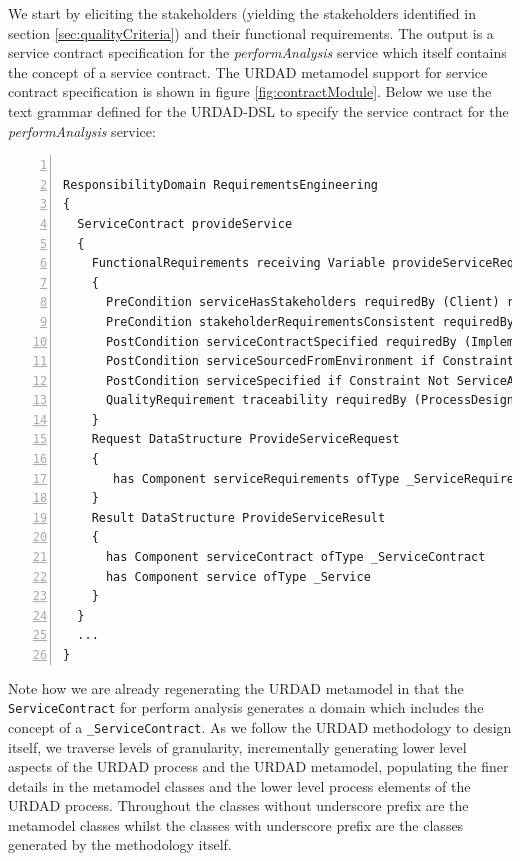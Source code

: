 We start by eliciting the stakeholders (yielding the stakeholders identified in section \ref{sec:qualityCriteria}) and their functional requirements. The output is a service contract specification for the \emph{performAnalysis} service which itself contains the concept of a service contract. The URDAD metamodel support for service contract specification is shown in figure \ref{fig:contractModule}. Below we use the text grammar defined for the URDAD-DSL to specify the service contract for the \emph{performAnalysis} service:

\lstset{language=urdad,caption=Specifying a state constraint in the URDAD text grammar.,label=contractTextSyntax}
\begin{lstlisting}[numbers=left,escapechar=|]

ResponsibilityDomain RequirementsEngineering
{
  ServiceContract provideService
  {
    FunctionalRequirements receiving Variable provideServiceRequest ofType ProvideServiceRequest yielding Variable provideServiceResult ofType ProvideServiceResult
    {
      PreCondition serviceHasStakeholders requiredBy (Client) raises NoStakeholdersException checks Constraint ServiceHasStakeholders
      PreCondition stakeholderRequirementsConsistent requiredBy (Client Implementation Testing) raises InconsistentStakeholderRequirementsException checks Constraint RequirementsConsistent
      PostCondition serviceContractSpecified requiredBy (Implementation Testing) ensures Constraint ServiceContractSpecified
      PostCondition serviceSourcedFromEnvironment if Constraint ServiceAvailable requiredBy (Client) ensures Constraint ServiceSourced with Query OCL:"serviceContract"
      PostCondition serviceSpecified if Constraint Not ServiceAvailable requiredBy(Client Implementation) ensures ServiceSpecified
      QualityRequirement traceability requiredBy (ProcessDesign ProjectManagement Development)  
    }
    Request DataStructure ProvideServiceRequest
    {
       has Component serviceRequirements ofType _ServiceRequirements
    }
    Result DataStructure ProvideServiceResult
    {
      has Component serviceContract ofType _ServiceContract
      has Component service ofType _Service
    }        
  }
  ...
} 
\end{lstlisting}

Note how we are already regenerating the URDAD metamodel in that the \verb+ServiceContract+ for perform analysis generates a domain which includes the concept of a \verb+_ServiceContract+. As we follow the URDAD methodology to design itself, we traverse levels of granularity, incrementally generating lower level aspects of the URDAD process and the URDAD metamodel, populating the finer details in the metamodel classes and the lower level process elements of the URDAD process. Throughout the classes without underscore prefix are the metamodel classes whilst the classes with underscore prefix are the classes generated by the methodology itself. 


